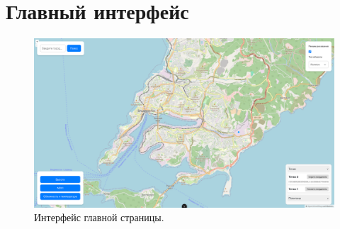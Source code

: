 \chapter{Главный интерфейс}
\label{cha:MainUI}

\begin{figure}[h]  %
	\centering
	\includegraphics[height=0.6\textwidth]{imgs/mainUI.png}  %
	\caption{Интерфейс главной страницы.}  %
	\label{fig:base}  %
\end{figure}
